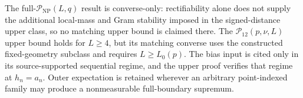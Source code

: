 The full-\(\mathcal P_{\mathrm{NP}}(L,q)\) result is converse-only: rectifiability alone does not supply the additional local-mass and Gram stability imposed in the signed-distance upper class, so no matching upper bound is claimed there.  The \(\mathcal P_{12}(p,\nu,L)\) upper bound holds for \(L\geq4\), but its matching converse uses the constructed fixed-geometry subclass and requires \(L\geq L_0(p)\).  The bias input is cited only in its source-supported sequential regime, and the upper proof verifies that regime at \(h_n=a_n\).  Outer expectation is retained wherever an arbitrary point-indexed family may produce a nonmeasurable full-boundary supremum.